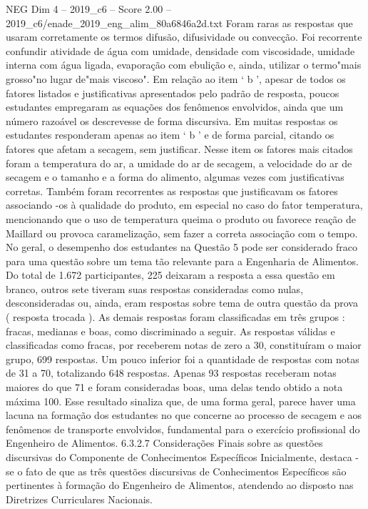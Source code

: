 \begin{textsample}{NEG Dim 4 – 2019\_c6 – Score 2.00 – 2019\_c6/enade\_2019\_eng\_alim\_80a6846a2d.txt}
Foram raras as respostas que usaram corretamente os termos difusão, difusividade ou convecção.
Foi recorrente confundir atividade de água com umidade, densidade com viscosidade, umidade interna com água ligada, evaporação com ebulição e, ainda, utilizar o termo"mais grosso"no lugar de"mais viscoso".
Em relação ao item ‘ b ’, apesar de todos os fatores listados e justificativas apresentados pelo padrão de resposta, poucos estudantes empregaram as equações dos fenômenos envolvidos, ainda que um número razoável os descrevesse de forma discursiva.
Em muitas respostas os estudantes responderam apenas ao item ‘ b ’ e de forma parcial, citando os fatores que afetam a secagem, sem justificar.
Nesse item os fatores mais citados foram a temperatura do ar, a umidade do ar de secagem, a velocidade do ar de secagem e o tamanho e a forma do alimento, algumas vezes com justificativas corretas.
Também foram recorrentes as respostas que justificavam os fatores associando -os à qualidade do produto, em especial no caso do fator temperatura, mencionando que o uso de temperatura queima o produto ou favorece reação de Maillard ou provoca caramelização, sem fazer a correta associação com o tempo.
No geral, o desempenho dos estudantes na Questão 5 pode ser considerado fraco para uma questão sobre um tema tão relevante para a Engenharia de Alimentos.
Do total de 1.672 participantes, 225 deixaram a resposta a essa questão em branco, outros sete tiveram suas respostas consideradas como nulas, desconsideradas ou, ainda, eram respostas sobre tema de outra questão da prova ( resposta trocada ).
As demais respostas foram classificadas em três grupos : fracas, medianas e boas, como discriminado a seguir.
As respostas válidas e classificadas como fracas, por receberem notas de zero a 30, constituíram o maior grupo, 699 respostas.
Um pouco inferior foi a quantidade de respostas com notas de 31 a 70, totalizando 648 respostas.
Apenas 93 respostas receberam notas maiores do que 71 e foram consideradas boas, uma delas tendo obtido a nota máxima 100.
Esse resultado sinaliza que, de uma forma geral, parece haver uma lacuna na formação dos estudantes no que concerne ao processo de secagem e aos fenômenos de transporte envolvidos, fundamental para o exercício profissional do Engenheiro de Alimentos. 6.3.2.7 Considerações Finais sobre as questões discursivas do Componente de Conhecimentos Específicos Inicialmente, destaca -se o fato de que as três questões discursivas de Conhecimentos Específicos são pertinentes à formação do Engenheiro de Alimentos, atendendo ao disposto nas Diretrizes Curriculares Nacionais.

\end{textsample}
